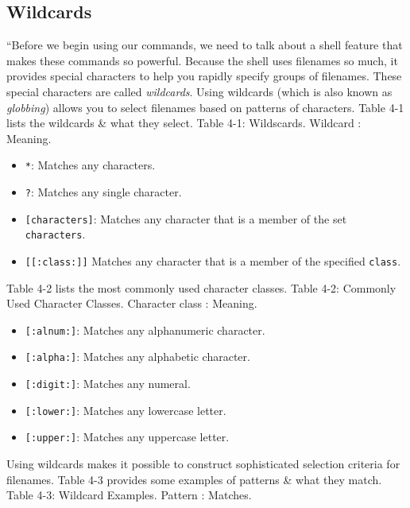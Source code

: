 \documentclass[oneside]{book}
\numberwithin{equation}{section}
\begin{document}
\subsection{Wildcards}
``Before we begin using our commands, we need to talk about a shell feature that makes these commands so powerful. Because the shell uses filenames so much, it provides special characters to help you rapidly specify groups of filenames. These special characters are called \textit{wildcards}. Using wildcards (which is also known as \textit{globbing}) allows you to select filenames based on patterns of characters. Table 4-1 lists the wildcards \& what they select. \textsf{Table 4-1: Wildscards. Wildcard : Meaning.}
\begin{itemize}
	\item \texttt{*}: Matches any characters.
	\item \texttt{?}: Matches any single character.
	\item \texttt{[characters]}: Matches any character that is a member of the set \texttt{characters}.
	\item \texttt{[[:class:]]} Matches any character  that is a member of the specified \texttt{class}.
\end{itemize}
Table 4-2 lists the most commonly used character classes. \textsf{Table 4-2: Commonly Used Character Classes. Character class : Meaning}.
\begin{itemize}
	\item \texttt{[:alnum:]}: Matches any alphanumeric character.
	\item \texttt{[:alpha:]}: Matches any alphabetic character.
	\item \texttt{[:digit:]}: Matches any numeral.
	\item \texttt{[:lower:]}: Matches any lowercase letter.
	\item \texttt{[:upper:]}: Matches any uppercase letter.
\end{itemize}
Using wildcards makes it possible to construct sophisticated selection criteria for filenames. Table 4-3 provides some examples of patterns \& what they match. \textsf{Table 4-3: Wildcard Examples. Pattern : Matches.}
\end{document}
